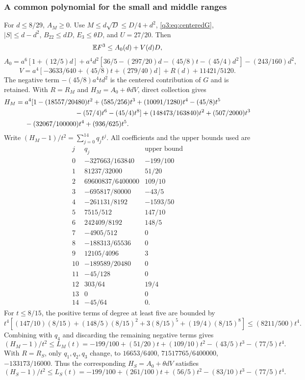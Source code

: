 \subsubsection{A common polynomial for the small and middle ranges}
For $d\le8/29$, $A_M\ge0$. Use
$M\le d\sqrt D\le D/4+d^2$, \eqref{q3:eq:centeredG}, $|S|\le d-d^2$,
$B_{22}\le dD$, $E_3\le\theta D$, and $U=27/20$. Then
\begin{equation}\label{q3:eq:A0V}
 \mathbb E F^3\le A_0(d)+V(d)D,
\end{equation}
\[
 A_0=a^6[1+(12/5)d]+
 a^4d^2[36/5-(297/20)d-(45/8)t-(45/4)d^2]-(243/160)d^2,
\]
\[
 V=a^4[-3633/640+(45/8)t+(279/40)d]+R(d)+11421/5120.
\]
The negative term $-(45/8)a^4td^2$ is the centered contribution of $G$ and is retained.
With $R=R_M$ and $H_M=A_0+\theta dV$, direct collection gives
\[
\begin{split}
 H_M={}&a^4[1-(18557/20480)t^2+(585/256)t^3+
 (10091/1280)t^4-(45/8)t^5\\
 &\hspace{26mm}-(57/4)t^6-(45/4)t^8]
 +(148473/163840)t^2+(507/2000)t^3\\
 &-(32067/100000)t^4+(936/625)t^5.
\end{split}
\]
Write $(H_M-1)/t^2=\sum_{j=0}^{14}q_jt^j$. All coefficients and the upper bounds used are
\[
\begin{array}{r|r|r}
j&q_j&\text{upper bound}\\\hline
0&-327663/163840&-199/100\\
1&81237/32000&51/20\\
2&69600837/6400000&109/10\\
3&-695817/80000&-43/5\\
4&-261131/8192&-1593/50\\
5&7515/512&147/10\\
6&242409/8192&148/5\\
7&-4905/512&0\\
8&-188313/65536&0\\
9&12105/4096&3\\
10&-189589/20480&0\\
11&-45/128&0\\
12&303/64&19/4\\
13&0&0\\
14&-45/64&0 .
\end{array}
\]
For $t\le8/15$, the positive terms of degree at least five are bounded by
\[
 t^4[(147/10)(8/15)+(148/5)(8/15)^2+
 3(8/15)^5+(19/4)(8/15)^8]\le(8211/500)t^4.
\]
Combining with $q_4$ and discarding the remaining negative terms gives
\[
 (H_M-1)/t^2\le L_M(t)
 =-199/100+(51/20)t+(109/10)t^2-(43/5)t^3-(77/5)t^4.
\]
With $R=R_S$, only $q_1,q_2,q_3$ change, to
$16653/6400$, $71517765/6400000$, $-133173/16000$.
Thus the corresponding $H_S=A_0+\theta dV$ satisfies
\[
 (H_S-1)/t^2\le L_S(t)
 =-199/100+(261/100)t+(56/5)t^2-(83/10)t^3-(77/5)t^4.
\]

